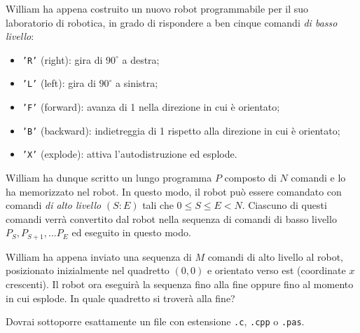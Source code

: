 \usepackage{xcolor}
\usepackage{afterpage}
\usepackage{pifont,mdframed}
\usepackage[bottom]{footmisc}

\makeatletter
\gdef\this@inputfilename{input.txt}
\gdef\this@outputfilename{output.txt}
\makeatother

\newcommand{\inputfile}{\texttt{input.txt}}
\newcommand{\outputfile}{\texttt{output.txt}}

\newenvironment{warning}
  {\par\begin{mdframed}[linewidth=2pt,linecolor=gray]%
    \begin{list}{}{\leftmargin=1cm
                   \labelwidth=\leftmargin}\item[\Large\ding{43}]}
  {\end{list}\end{mdframed}\par}

	William ha appena costruito un nuovo robot programmabile per il suo laboratorio di robotica, in grado di rispondere a ben cinque comandi \emph{di basso livello}:
	\begin{itemize}
		\item \texttt{'R'} (right): gira di $90^\circ$ a destra;
		\item \texttt{'L'} (left): gira di $90^\circ$ a sinistra;
		\item \texttt{'F'} (forward): avanza di 1 nella direzione in cui \`e orientato;
		\item \texttt{'B'} (backward): indietreggia di 1 rispetto alla direzione in cui \`e orientato;
		\item \texttt{'X'} (explode): attiva l'autodistruzione ed esplode.
	\end{itemize}
	William ha dunque scritto un lungo programma $P$ composto di $N$ comandi e lo ha memorizzato nel robot. In questo modo, il robot pu\`o essere comandato con comandi \emph{di alto livello} $(S:E)$ tali che $0 \le S \le E < N$. Ciascuno di questi comandi verr\`a convertito dal robot nella sequenza di comandi di basso livello $P_S, P_{S+1}, \ldots P_E$ ed eseguito in questo modo.

	William ha appena inviato una sequenza di $M$ comandi di alto livello al robot, posizionato inizialmente nel quadretto $(0,0)$ e orientato verso est (coordinate $x$ crescenti). Il robot ora eseguir\`a la sequenza fino alla fine oppure fino al momento in cui esplode. In quale quadretto si trover\`a alla fine?

\Implementation
Dovrai sottoporre esattamente un file con estensione \texttt{.c}, \texttt{.cpp} o \texttt{.pas}.

